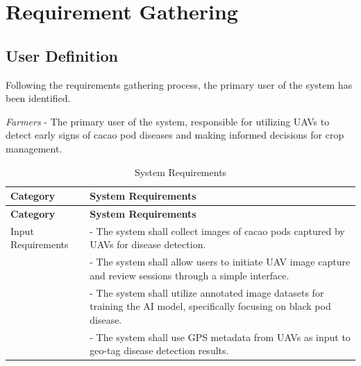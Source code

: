 \section{Requirement Gathering}

\subsection{User Definition}

Following the requirements gathering process, the primary user of the system has been identified.

\textit{Farmers} - The primary user of the system, responsible for utilizing UAVs to detect early signs of cacao pod diseases and making informed decisions for crop management.

\begin{longtable}{p{4cm} p{8cm}}
	\caption{System Requirements} \label{tab:sysreq}                                                                                                                                      \\

	\toprule
	\textbf{Category}        & \textbf{System Requirements}                                                                                                                               \\
	\midrule
	\endfirsthead

	\toprule
	\textbf{Category}        & \textbf{System Requirements}                                                                                                                               \\
	\midrule
	\endhead

	\bottomrule
	\endfoot

	Input Requirements       & - The system shall collect images of cacao pods captured by UAVs for disease detection.                                                                    \\
	                         & - The system shall allow users to initiate UAV image capture and review sessions through a simple interface.                                               \\
	                         & - The system shall utilize annotated image datasets for training the AI model, specifically focusing on black pod disease.                                 \\
	                         & - The system shall use GPS metadata from UAVs as input to geo-tag disease detection results.                                                               \\
	\midrule


\end{longtable}
